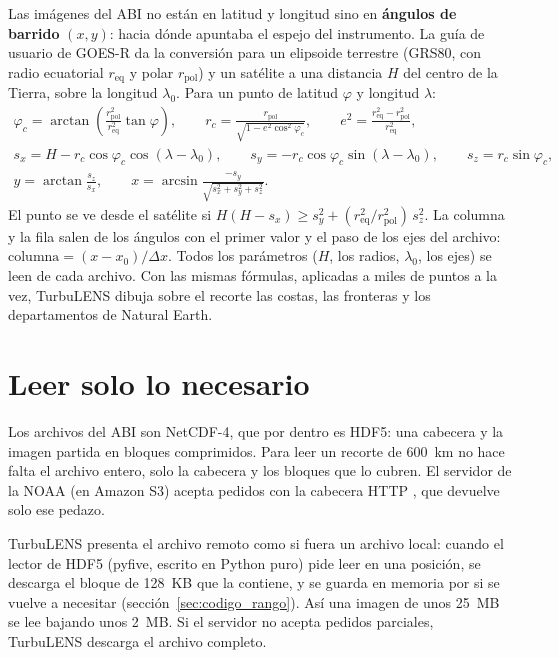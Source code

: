 Las imágenes del ABI no están en latitud y longitud sino en \textbf{ángulos de barrido} $(x, y)$: hacia dónde apuntaba el
espejo del instrumento. La guía de usuario de GOES-R da la conversión para un elipsoide terrestre (GRS80, con radio
ecuatorial $r_\text{eq}$ y polar $r_\text{pol}$) y un satélite a una distancia $H$ del centro de la Tierra, sobre la
longitud $\lambda_0$. Para un punto de latitud $\varphi$ y longitud $\lambda$:
\begin{gather}
\varphi_c = \arctan\!\left(\frac{r_\text{pol}^2}{r_\text{eq}^2}\tan\varphi\right),\qquad
r_c = \frac{r_\text{pol}}{\sqrt{1 - e^2\cos^2\varphi_c}},\qquad e^2 = \frac{r_\text{eq}^2 - r_\text{pol}^2}{r_\text{eq}^2},\\
s_x = H - r_c\cos\varphi_c\cos(\lambda-\lambda_0),\qquad s_y = -r_c\cos\varphi_c\sin(\lambda-\lambda_0),\qquad
s_z = r_c\sin\varphi_c,\\
y = \arctan\frac{s_z}{s_x},\qquad x = \arcsin\frac{-s_y}{\sqrt{s_x^2 + s_y^2 + s_z^2}} .
\end{gather}
El punto se ve desde el satélite si $H(H - s_x) \ge s_y^2 + (r_\text{eq}^2/r_\text{pol}^2)\,s_z^2$. La columna y la fila
salen de los ángulos con el primer valor y el paso de los ejes del archivo: $\text{columna} = (x - x_0)/\Delta x$. Todos
los parámetros ($H$, los radios, $\lambda_0$, los ejes) se leen de cada archivo. Con las mismas fórmulas, aplicadas a miles
de puntos a la vez, TurbuLENS dibuja sobre el recorte las costas, las fronteras y los departamentos de Natural Earth.

\section{Leer solo lo necesario}\label{sec:lectura_parcial}

Los archivos del ABI son NetCDF-4, que por dentro es HDF5: una cabecera y la imagen partida en bloques comprimidos. Para
leer un recorte de 600~km no hace falta el archivo entero, solo la cabecera y los bloques que lo cubren. El servidor de
la NOAA (en Amazon S3) acepta pedidos con la cabecera HTTP , que devuelve solo ese pedazo.

TurbuLENS presenta el archivo remoto como si fuera un archivo local: cuando el lector de HDF5 (pyfive, escrito en Python
puro) pide leer en una posición, se descarga el bloque de 128~KB que la contiene, y se guarda en memoria por si se vuelve a
necesitar (sección~\ref{sec:codigo_rango}). Así una imagen de unos 25~MB se lee bajando unos 2~MB. Si el servidor no
acepta pedidos parciales, TurbuLENS descarga el archivo completo.

